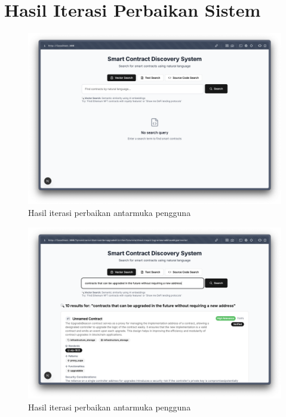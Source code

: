 \chapter{Hasil Iterasi Perbaikan Sistem}
\label{appendix:iterasi-perbaikan-sistem}

\begin{figure}[ht]
	\centering
	\includegraphics[width=1\textwidth]{resources/appendix/hasil-iterasi-gui-1.png}
	\caption{Hasil iterasi perbaikan antarmuka pengguna}
	\label{image:hasil-iterasi-gui-1}
\end{figure}

\begin{figure}[ht]
	\centering
	\includegraphics[width=1\textwidth]{resources/appendix/hasil-iterasi-gui-2.png}
	\caption{Hasil iterasi perbaikan antarmuka pengguna}
	\label{image:hasil-iterasi-gui-2}
\end{figure}

